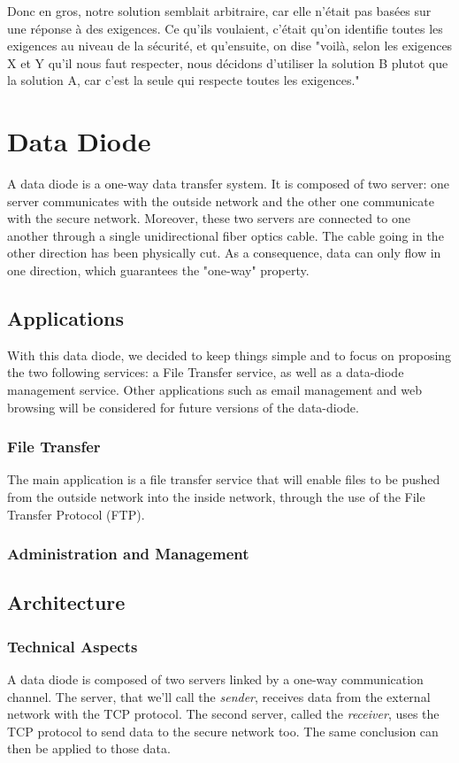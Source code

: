 \documentclass[a4paper,11pt]{article}
\begin{document}
Donc en gros, notre solution semblait arbitraire, car elle n'était pas basées sur une réponse à des exigences. Ce qu'ils voulaient, c'était qu'on identifie toutes les exigences au niveau de la sécurité, et qu'ensuite, on dise "voilà, selon les exigences X et Y qu'il nous faut respecter, nous décidons d'utiliser la solution B plutot que la solution A, car c'est la seule qui respecte toutes les exigences."

\section{Data Diode}
A data diode is a one-way data transfer system. It is composed of two server: one server communicates with the outside network and the other one communicate with the secure network. Moreover, these two servers are connected to one another through a single unidirectional fiber optics cable. The cable going in the other direction has been physically cut. As a consequence, data can only flow in one direction, which guarantees the "one-way" property.

\subsection{Applications}
With this data diode, we decided to keep things simple and to focus on proposing the two following services: a File Transfer service, as well as a data-diode management service. 
Other applications such as email management and web browsing will be considered for future versions of the data-diode.

\subsubsection{File Transfer}
The main application is a file transfer service that will enable files to be pushed from the outside network into the inside network, through the use of the File Transfer Protocol (FTP).

\subsubsection{Administration and Management}


\subsection{Architecture}
\subsubsection{Technical Aspects}
A data diode is composed of two servers linked by a one-way communication channel. The server, that we'll call the \textit{sender}, receives data from the external network with the TCP protocol. The second server, called the \textit{receiver}, uses the TCP protocol to send data to the secure network too. The same conclusion can then be applied to those data.\\
\end{document}
